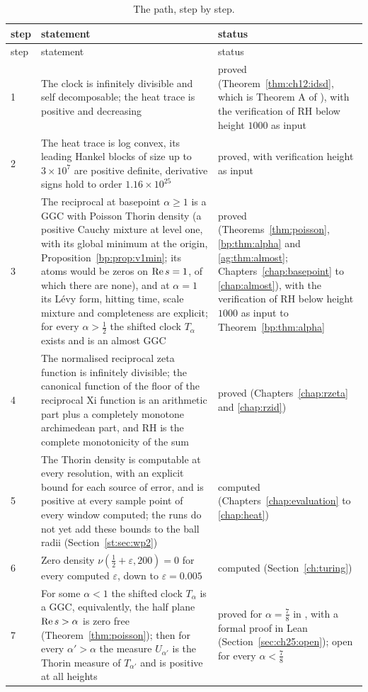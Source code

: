 \begin{longtable}{p{}p{}p{}}
\caption{The path, step by step.}\label{tab:ch25:path}\\
\toprule
step & statement & status\\
\midrule
\endfirsthead
\toprule
step & statement & status\\
\midrule
\endhead
1 & The clock is infinitely divisible and self decomposable; the heat trace is positive and decreasing & proved (Theorem~\ref{thm:ch12:idsd}, which is Theorem A of \cite{P26}), with the verification of RH below height $1000$ as input\\
2 & The heat trace is log convex, its leading Hankel blocks of size up to $3\times10^7$ are positive definite, derivative signs hold to order $1.16\times10^{25}$ & proved, with verification height as input\\
3 & The reciprocal at basepoint $\alpha\ge1$ is a GGC with Poisson Thorin density (a positive Cauchy mixture at level one, with its global minimum at the origin, Proposition~\ref{bp:prop:v1min}; its atoms would be zeros on $\operatorname{Re} s=1$, of which there are none), and at $\alpha=1$ its L\'evy form, hitting time, scale mixture and completeness are explicit; for every $\alpha>\frac12$ the shifted clock $T_\alpha$ exists and is an almost GGC & proved (Theorems~\ref{thm:poisson}, \ref{bp:thm:alpha} and \ref{ag:thm:almost}; Chapters~\ref{chap:basepoint} to \ref{chap:almost}), with the verification of RH below height $1000$ as input to Theorem~\ref{bp:thm:alpha}\\
4 & The normalised reciprocal zeta function is infinitely divisible; the canonical function of the floor of the reciprocal Xi function is an arithmetic part plus a completely monotone archimedean part, and RH is the complete monotonicity of the sum & proved (Chapters~\ref{chap:rzeta} and \ref{chap:rzid})\\
5 & The Thorin density is computable at every resolution, with an explicit bound for each source of error, and is positive at every sample point of every window computed; the runs do not yet add these bounds to the ball radii (Section~\ref{st:sec:wp2}) & computed (Chapters~\ref{chap:evaluation} to \ref{chap:heat})\\
6 & Zero density $\nu(\frac12+\varepsilon,200)=0$ for every computed $\varepsilon$, down to $\varepsilon=0.005$ & computed (Section~\ref{ch:turing})\\
7 & For some $\alpha<1$ the shifted clock $T_\alpha$ is a GGC, equivalently, the half plane $\operatorname{Re} s>\alpha$ is zero free (Theorem~\ref{thm:poisson}); then for every $\alpha'>\alpha$ the measure $U_{\alpha'}$ is the Thorin measure of $T_{\alpha'}$ and is positive at all heights & proved for $\alpha=\frac78$ in \cite{OAI26a}, with a formal proof in Lean (Section~\ref{sec:ch25:open}); open for every $\alpha<\frac78$\\

\end{longtable}
